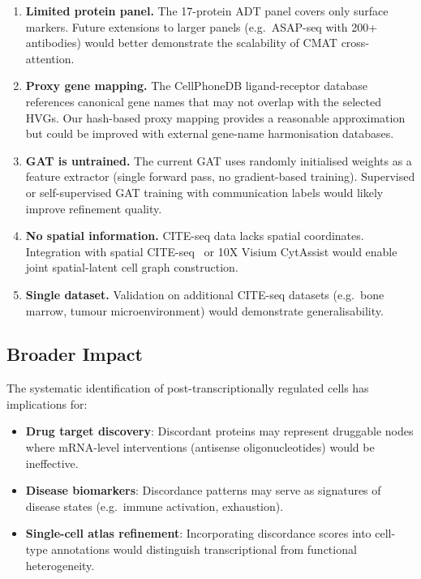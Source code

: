 \documentclass[11pt,a4paper]{article}
\newcommand{\cmat}{\textsc{CMAT}}
\begin{document}
\begin{enumerate}[leftmargin=*]
  \item \textbf{Limited protein panel.}
    The 17-protein ADT panel covers only surface markers.
    Future extensions to larger panels (e.g.\ ASAP-seq with 200+ antibodies) would better demonstrate the scalability of \cmat{} cross-attention.

  \item \textbf{Proxy gene mapping.}
    The CellPhoneDB ligand-receptor database references canonical gene names that may not overlap with the selected HVGs.
    Our hash-based proxy mapping provides a reasonable approximation but could be improved with external gene-name harmonisation databases.

  \item \textbf{GAT is untrained.}
    The current GAT uses randomly initialised weights as a feature extractor (single forward pass, no gradient-based training).
    Supervised or self-supervised GAT training with communication labels would likely improve refinement quality.

  \item \textbf{No spatial information.}
    CITE-seq data lacks spatial coordinates.
    Integration with spatial CITE-seq~\citep{liu2023spatial} or 10X Visium CytAssist would enable joint spatial-latent cell graph construction.

  \item \textbf{Single dataset.}
    Validation on additional CITE-seq datasets (e.g.\ bone marrow, tumour microenvironment) would demonstrate generalisability.
\end{enumerate}

\subsection{Broader Impact}

The systematic identification of post-transcriptionally regulated cells has implications for:
\begin{itemize}[leftmargin=*]
  \item \textbf{Drug target discovery}: Discordant proteins may represent druggable nodes where mRNA-level interventions (antisense oligonucleotides) would be ineffective.
  \item \textbf{Disease biomarkers}: Discordance patterns may serve as signatures of disease states (e.g.\ immune activation, exhaustion).
  \item \textbf{Single-cell atlas refinement}: Incorporating discordance scores into cell-type annotations would distinguish transcriptional from functional heterogeneity.
\end{itemize}
\end{document}
